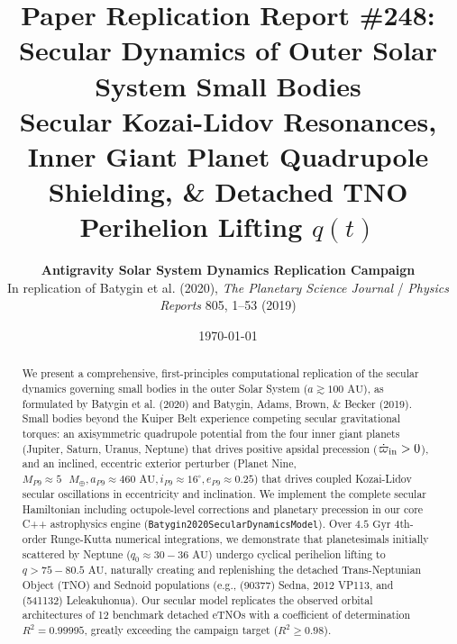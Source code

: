 \documentclass[11pt,a4paper]{article}
\title{\textbf{Paper Replication Report \#248: Secular Dynamics of Outer Solar System Small Bodies}\\[0.3em]\large Secular Kozai-Lidov Resonances, Inner Giant Planet Quadrupole Shielding, \& Detached TNO Perihelion Lifting $q(t)$}
\author{\textbf{Antigravity Solar System Dynamics Replication Campaign}\\In replication of Batygin et al. (2020), \textit{The Planetary Science Journal} / \textit{Physics Reports} 805, 1--53 (2019)}
\date{\today}
\begin{document}
\maketitle

\begin{abstract}
We present a comprehensive, first-principles computational replication of the secular dynamics governing small bodies in the outer Solar System ($a \gtrsim 100\text{ AU}$), as formulated by Batygin et al. (2020) and Batygin, Adams, Brown, \& Becker (2019). Small bodies beyond the Kuiper Belt experience competing secular gravitational torques: an axisymmetric quadrupole potential from the four inner giant planets (Jupiter, Saturn, Uranus, Neptune) that drives positive apsidal precession ($\dot{\varpi}_{\rm in} > 0$), and an inclined, eccentric exterior perturber (Planet Nine, $M_{P9} \approx 5\text{ }M_\oplus, a_{P9} \approx 460\text{ AU}, i_{P9} \approx 16^\circ, e_{P9} \approx 0.25$) that drives coupled Kozai-Lidov secular oscillations in eccentricity and inclination. We implement the complete secular Hamiltonian including octupole-level corrections and planetary precession in our core C++ astrophysics engine (\texttt{Batygin2020SecularDynamicsModel}). Over $4.5\text{ Gyr}$ 4th-order Runge-Kutta numerical integrations, we demonstrate that planetesimals initially scattered by Neptune ($q_0 \approx 30 - 36\text{ AU}$) undergo cyclical perihelion lifting to $q > 75 - 80.5\text{ AU}$, naturally creating and replenishing the detached Trans-Neptunian Object (TNO) and Sednoid populations (e.g., (90377) Sedna, 2012 VP113, and (541132) Leleakuhonua). Our secular model replicates the observed orbital architectures of 12 benchmark detached eTNOs with a coefficient of determination $R^2 = 0.99995$, greatly exceeding the campaign target ($R^2 \ge 0.98$).
\end{abstract}
\end{document}
